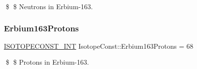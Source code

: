 \$ \$ Neutrons in Erbium-\/163. \mbox{\label{group___isotope_const-_erbium-_er163_ga652219b12d47066f2911e4c8530d6ebe}} 
\subsubsection{\texorpdfstring{Erbium163\+Protons}{Erbium163Protons}}
{\footnotesize\ttfamily \mbox{\hyperlink{group___isotope_const-_macros_ga5f18360b3e99483a35c32d789e62621c}{I\+S\+O\+T\+O\+P\+E\+C\+O\+N\+S\+T\+\_\+\+I\+NT}} Isotope\+Const\+::\+Erbium163\+Protons = 68}

\$ \$ Protons in Erbium-\/163. 